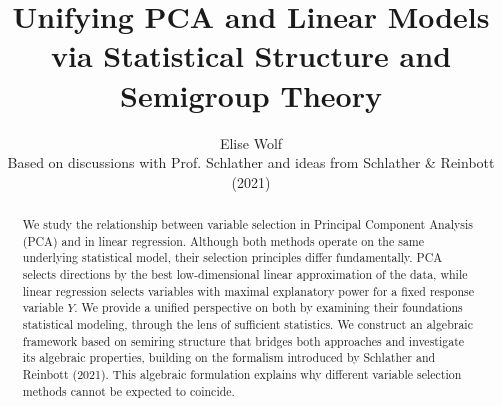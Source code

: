 \documentclass{article}
\title{Unifying PCA and Linear Models via Statistical Structure and Semigroup Theory}
\author{Elise Wolf \\ Based on discussions  with Prof. Schlather and ideas from Schlather \& Reinbott (2021)}
\date{}
\theoremstyle{definition}
\begin{document}
\maketitle

\begin{abstract}

We study the relationship between variable selection in Principal Component Analysis (PCA) and in linear regression. Although both methods operate on the same underlying statistical model, their selection principles differ fundamentally. PCA selects directions by the best low-dimensional linear approximation of the data, while linear regression selects variables with maximal explanatory power for a fixed response variable $Y$. We provide a unified perspective on both by examining their foundations statistical modeling, through the lens of sufficient statistics. We construct an algebraic framework based on semiring structure that bridges both approaches and investigate its algebraic properties, building on the formalism introduced by Schlather and Reinbott (2021). This algebraic formulation explains why different variable selection methods cannot be expected to coincide.
\end{abstract}

\tableofcontents














\newpage












\end{document}
